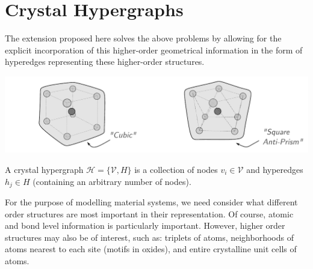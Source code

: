 \documentclass[10pt,a4paper]{article}
\begin{document}
\section{Crystal Hypergraphs}
The extension proposed here solves the above problems by allowing for the explicit incorporation of this higher-order geometrical information in the form of hyperedges representing these higher-order structures.
\begin{center}
\includegraphics[scale=0.7]{crystalgraph_cntex_3.pdf}
\end{center}
A crystal hypergraph $\mathcal{H}=\lbrace\mathcal{V}, \mathit{H} \rbrace$ is a collection of nodes $v_i\in \mathcal{V}$ and hyperedges $h_j\in \mathit{H}$ (containing an arbitrary number of nodes).

For the purpose of modelling material systems, we need consider what different order structures are most important in their representation. Of course, atomic and bond level information is particularly important. However, higher order structures may also be of interest, such as: triplets of atoms, neighborhoods of atoms nearest to each site (motifs in oxides), and entire crystalline unit cells of atoms.
\end{document}
